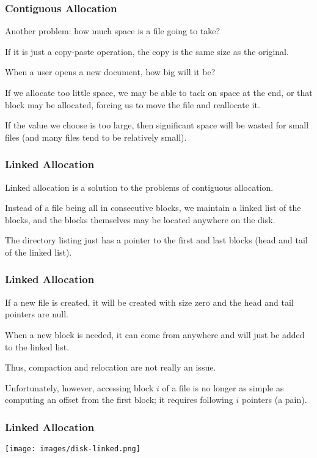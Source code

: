 \begin{frame}
\frametitle{Contiguous Allocation}

Another problem: how much space is a file going to take? 

If it is just a copy-paste operation, the copy is the same size as the original. 

When a user opens a new document, how big will it be? 

If we allocate too little space, we may be able to tack on space at the end, or that block may be allocated, forcing us to move the file and reallocate it. 

If the value we choose is too large, then significant space will be wasted for small files (and many files tend to be relatively small).

\end{frame}

\begin{frame}
\frametitle{Linked Allocation}

Linked allocation is a solution to the problems of contiguous allocation.

Instead of a file being all in consecutive blocks, we maintain a linked list of the blocks, and the blocks themselves may be located anywhere on the disk. 

The directory listing just has a pointer to the first and last blocks (head and tail of the linked list).

\end{frame}

\begin{frame}
\frametitle{Linked Allocation}

If a new file is created, it will be created with size zero and the head and tail pointers are null.

 When a new block is needed, it can come from anywhere and will just be added to the linked list. 
 
 Thus, compaction and relocation are not really an issue. 
 
 Unfortunately, however, accessing block $i$ of a file is no longer as simple as computing an offset from the first block; it requires following $i$ pointers (a pain).


\end{frame}

\begin{frame}
\frametitle{Linked Allocation}

\begin{center}
	\texttt{[image: images/disk-linked.png]}
\end{center}

\end{frame}

